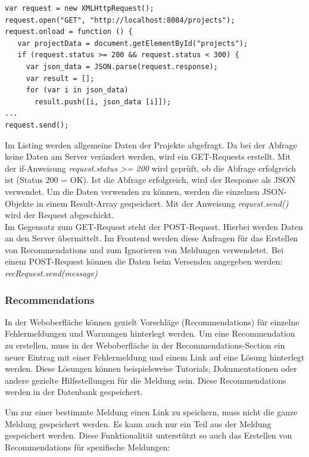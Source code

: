 \begin{samepage}%
	\begin{lstlisting}[float=tbhp]
var request = new XMLHttpRequest();
request.open("GET", "http://localhost:8084/projects");
request.onload = function () {
   var projectData = document.getElementById("projects");
   if (request.status >= 200 && request.status < 300) {
     var json_data = JSON.parse(request.response);
     var result = [];
     for (var i in json_data)
       result.push([i, json_data [i]]);
...
request.send();

	\end{lstlisting}
\end{samepage}

Im Listing werden allgemeine Daten der Projekte abgefragt. Da bei der Abfrage keine Daten am Server verändert werden, wird ein GET-Requests erstellt. Mit der if-Anweisung \textit{request.status >= 200} wird geprüft, ob die Abfrage erfolgreich ist (Status 200 = OK). Ist die Abfrage erfolgreich, wird der Response als JSON verwendet. Um die Daten verwenden zu können, werden die einzelnen JSON-Objekte in einem Result-Array gespeichert. Mit der Anweisung \textit{request.send()} wird der Request abgeschickt. \\
Im Gegensatz zum GET-Request steht der POST-Request. Hierbei werden Daten an den Server übermittelt. Im Frontend werden diese Anfragen für das Erstellen von Recommendations und zum Ignorieren von Meldungen verwendetet. Bei einem POST-Request können die Daten beim Versenden angegeben werden: \textit{recRequest.send(message)}

\subsubsection{Recommendations}
In der Weboberfläche können gezielt Vorschläge (Recommendations) für einzelne Fehlermeldungen und Warnungen hinterlegt werden. Um eine Recommendation zu erstellen, muss in der Weboberfläche in der Recommendations-Section ein neuer Eintrag mit einer Fehlermeldung und einem Link auf eine Lösung hinterlegt werden. Diese Lösungen können beispielsweise Tutorials, Dokumentationen oder andere gezielte Hilfsstellungen für die Meldung sein. Diese Recommendations werden in der Datenbank gespeichert.

Um zur einer bestimmte Meldung einen Link zu speichern, muss nicht die ganze Meldung gespeichert werden. Es kann auch nur ein Teil aus der Meldung gespeichert werden. Diese Funktionalität unterstützt so auch das Erstellen von Recommendations für spezifische Meldungen:

